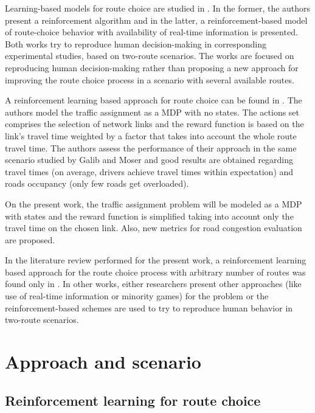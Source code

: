 \documentclass{RITA}
\begin{document}
Learning-based models for route choice are studied in \cite{Chmura&Pitz2007,Ben-Elia&Shiftan2010}. In the former, the authors present a reinforcement algorithm and in the latter, a reinforcement-based model of route-choice behavior with availability of real-time information is presented. Both works try to reproduce human decision-making in corresponding experimental studies, based on two-route scenarios. The works are focused on reproducing human decision-making rather than proposing a new approach for improving the route choice process in a scenario with several available routes.

A reinforcement learning based approach for route choice can be found in \cite{Tavares&Bazzan2012}. The authors model the traffic assignment as a MDP with no states. The actions set comprises the selection of network links and the reward function is based on the link's travel time weighted by a factor that takes into account the whole route travel time. The authors assess the performance of their approach in the same scenario studied by Galib and Moser \cite{Galib&Moser2011} and good results are obtained regarding travel times (on average, drivers achieve travel times within expectation) and roads occupancy (only few roads get overloaded). 

On the present work, the traffic assignment problem will be modeled as a MDP with states and the reward function is simplified taking into account only the travel time on the chosen link. Also, new metrics for road congestion evaluation are proposed. %

In the literature review performed for the present work, a reinforcement learning based approach for the route choice process with arbitrary number of routes was found only in \cite{Tavares&Bazzan2012}. In other works, either researchers present other approaches (like use of real-time information or minority games) for the problem or the reinforcement-based schemes are used to try to reproduce human behavior in two-route scenarios.

\section{Approach and scenario}
\label{sec:proposal}

\subsection{Reinforcement learning for route choice}
\end{document}
